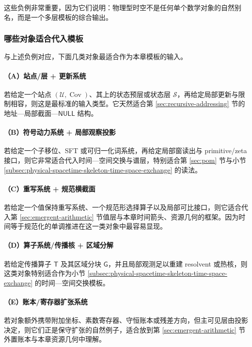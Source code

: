 这些负例非常重要，因为它们说明：物理型时空不是任何单个数学对象的自然别名，而是一个多层模板的综合输出。

\subsubsection{哪些对象适合代入模板}

与上述负例对应，下面几类对象最适合作为本章模板的输入。

\paragraph{（A）站点/层 + 更新系统}
若给定一个站点 \((\mathcal U,\operatorname{Cov})\)、其上的状态预层或状态层 \(\mathcal S\)，再给定局部更新与限制相容，则这是最标准的输入类型。它天然适合第 \ref{sec:recursive-addressing} 节的地址—局部截面—\(\mathsf{NULL}\) 结构。

\paragraph{（B）符号动力系统 + 局部观察投影}
若给定一个子移位、SFT 或可归一化词系统，再给定局部窗读出与 primitive/zeta 接口，则它非常适合代入时间—空间交换与谱层，特别适合第 \ref{sec:pom} 节与小节 \ref{subsec:physical-spacetime-skeleton-time-space-exchange} 的读法。

\paragraph{（C）重写系统 + 规范横截面}
若给定一个值保持重写系统、一个规范形选择算子以及局部可比接口，则它适合代入第 \ref{sec:emergent-arithmetic} 节值层与本章时间箭头、资源几何的框架。因为时间等于规范化的单调推进在这一类对象中最容易显现。

\paragraph{（D）算子系统/传播核 + 区域分解}
若给定传播算子 \(\mathsf T\) 及其区域分块 \(\mathsf G\)，并且局部观测足以重建 resolvent 或热核，则这类对象特别适合作为小节 \ref{subsec:physical-spacetime-skeleton-time-space-exchange} 的时间—空间交换模板。

\paragraph{（E）账本/寄存器扩张系统}
若对象额外携带附加坐标、素数寄存器、守恒账本或残差方向，但主可见层由投影决定，则它们正是保守扩张的自然例子，适合放到第 \ref{sec:emergent-arithmetic} 节外置账本与本章资源几何中理解。

